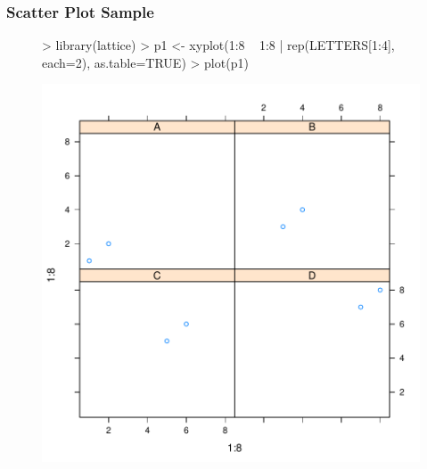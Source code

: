 \documentclass{beamer}
\begin{document}
\begin{frame}[containsverbatim]  
	\frametitle{Scatter Plot Sample}
\scriptsize
\begin{figure}
  \centering
\begin{Schunk}
\begin{Sinput}
> library(lattice)
> p1 <- xyplot(1:8 ~ 1:8 | rep(LETTERS[1:4], each=2), as.table=TRUE) 
> plot(p1)
\end{Sinput}
\end{Schunk}
\includegraphics{fig--029}
\label{fig:p1}
\end{figure}
\end{frame}
\end{document}
